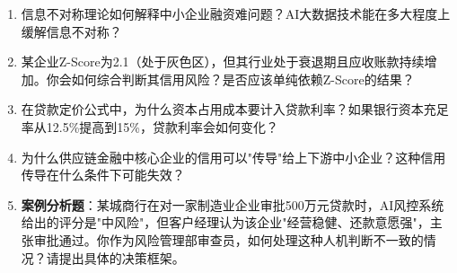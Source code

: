 \begin{exercisebox}[思考题]
\begin{enumerate}
  \item 信息不对称理论如何解释中小企业融资难问题？AI大数据技术能在多大程度上缓解信息不对称？
  \item 某企业Z-Score为2.1（处于灰色区），但其行业处于衰退期且应收账款持续增加。你会如何综合判断其信用风险？是否应该单纯依赖Z-Score的结果？
  \item 在贷款定价公式中，为什么资本占用成本要计入贷款利率？如果银行资本充足率从12.5\%提高到15\%，贷款利率会如何变化？
  \item 为什么供应链金融中核心企业的信用可以"传导"给上下游中小企业？这种信用传导在什么条件下可能失效？
  \item \textbf{案例分析题}：某城商行在对一家制造业企业审批500万元贷款时，AI风控系统给出的评分是"中风险"，但客户经理认为该企业"经营稳健、还款意愿强"，主张审批通过。你作为风险管理部审查员，如何处理这种人机判断不一致的情况？请提出具体的决策框架。
\end{enumerate}
\end{exercisebox}
